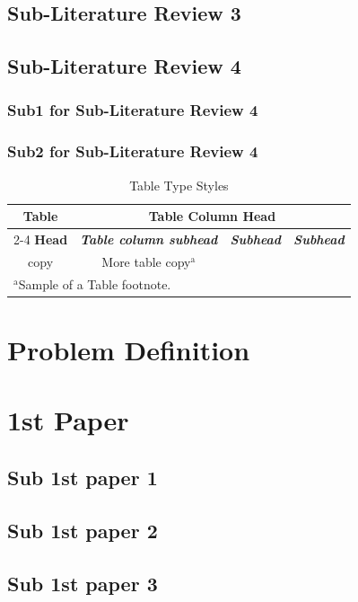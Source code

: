 \documentclass[12pt,a4paper]{report}
\begin{document}
\section{Sub-Literature Review 3}
\section{Sub-Literature Review 4}
\subsection{Sub1  for Sub-Literature Review 4}
\subsection{Sub2  for Sub-Literature Review 4}
\begin{table}[htbp]
	\caption{Table Type Styles}
	\begin{center}
		\begin{tabular}{|c|c|c|c|}
			\hline
			\textbf{Table}&\multicolumn{3}{|c|}{\textbf{Table Column Head}} \\
			\cline{2-4} 
			\textbf{Head} & \textbf{\textit{Table column subhead}}& \textbf{\textit{Subhead}}& \textbf{\textit{Subhead}} \\
			\hline
			copy& More table copy$^{\mathrm{a}}$& &  \\
			\hline
			\multicolumn{4}{l}{$^{\mathrm{a}}$Sample of a Table footnote.}
		\end{tabular}
		\label{tab1}
	\end{center}
\end{table}
\chapter{Problem Definition}
\noindent{\rule{\textwidth}{1.5pt}}
\chapter{1st Paper}
\noindent{\rule{\textwidth}{1.5pt}}
\section{Sub 1st paper 1}
\section{Sub 1st paper 2}
\section{Sub 1st paper 3}
\end{document}

